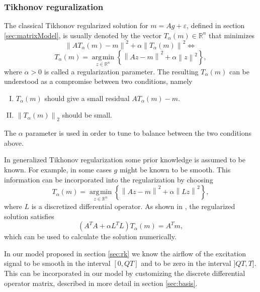 \documentclass[12pt,a4]{article}
\DeclareMathOperator*{\argmin}{\arg\!\min}
\newcommand{\R}{{\mathbb R}}
\newcommand{\lnorm}{\left\|}
\newcommand{\rnorm}{\right\|}
\begin{document}
\subsubsection{Tikhonov reguralization}\label{sec:tikh}
The classical Tikhonov regularized solution for $m = Ag + \varepsilon$, defined in section \ref{sec:matrixModel}, is usually denoted by the vector $T_\alpha(m)\in\R^n$ that minimizes
\begin{equation*}
\lnorm AT_\alpha(m) - m \rnorm^2 + \alpha \lnorm T_\alpha(m) \rnorm^2 \Leftrightarrow
\end{equation*}
\begin{equation*}
T_\alpha(m) = \underset{z\in\R^n}{\argmin}
\left\{ \lnorm Az - m \rnorm^2 + \alpha \lnorm z \rnorm^2 \right\},
\end{equation*}
where $\alpha > 0$ is called a regularization parameter. The resulting $T_\alpha(m)$ can be understood as a compromise between two conditions, namely
\begin{enumerate}[I.]
 \item $T_\alpha(m)$ should give a small residual $AT_\alpha(m) - m$.
 \item $\lnorm T_\alpha(m) \rnorm_2$ should be small.
\end{enumerate}
The $\alpha$ parameter is used in order to tune to balance between the two conditions above.

In generalized Tikhonov regularization some prior knowledge is assumed to be known. For example, in some cases $g$ might be known to be smooth. This information can be incorporated into the regularization by choosing
\begin{equation}
T_\alpha(m) = \underset{z\in\R^n}{\argmin}
\left\{ \lnorm Az - m \rnorm^2 + \alpha \lnorm Lz \rnorm^2 \right\},
\end{equation}  
where $L$ is a discretized differential operator. As shown in \cite{samu}, the regularized solution satisfies
\begin{equation}
\label{eq:tik-normal}
\left( A^T A + \alpha L^T L \right) T_{\alpha}(m) = A^T m ,
\end{equation}
which can be used to calculate the solution numerically.
 
In our model proposed in section \ref{sec:rk} we know the airflow of the excitation signal to be smooth in the interval $[0, QT]$ and to be zero in the interval $]QT, T]$. This can be incorporated in our model by customizing the discrete differential operator matrix, described in more detail in section \ref{sec:basis}.
\end{document}
